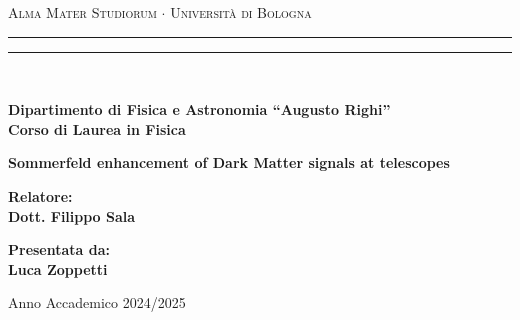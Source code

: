 
\begin{titlepage}
\begin{center}
{{\Large{\textsc{Alma Mater Studiorum $\cdot$ Universit\`a di Bologna}}}} 
\rule[0.1cm]{15.8cm}{0.1mm}
\rule[0.5cm]{15.8cm}{0.6mm}
\\\vspace{3mm}

{\small{\bf Dipartimento di Fisica e Astronomia “Augusto Righi”\\
Corso di Laurea in Fisica}}

\end{center}

\vspace{23mm}

\begin{center}
{\LARGE{\bf Sommerfeld enhancement of Dark Matter signals at telescopes}}\\
\end{center}

\vspace{50mm} \par \noindent

\begin{minipage}[t]{0.47\textwidth}
{\large{\bf Relatore: \vspace{2mm}\\
Dott. Filippo Sala}}
\end{minipage}
%
\hfill
%
\begin{minipage}[t]{0.47\textwidth}\raggedleft
{\large{\bf Presentata da:
\vspace{2mm}\\
Luca Zoppetti}}
\end{minipage}

\vspace{40mm}

\begin{center}
Anno Accademico 2024/2025
\end{center}

\end{titlepage}

